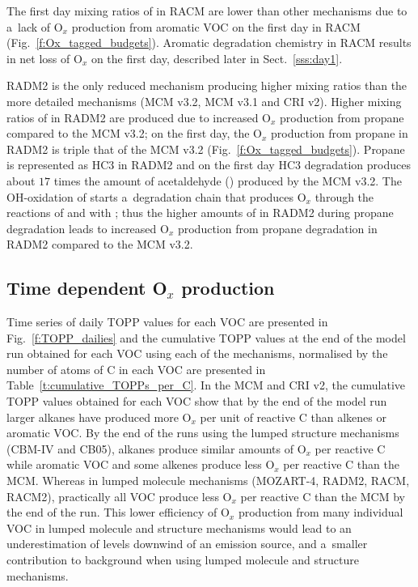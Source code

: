 \documentclass[acpd, online, hvmath]{copernicus}
\begin{document}
The first day mixing ratios of  in RACM are lower than other
mechanisms due to a~lack of O$_{x}$ production from aromatic VOC on
the first day in RACM (Fig.~\ref{f:Ox_tagged_budgets}).  Aromatic
degradation chemistry in RACM results in net loss of O$_{x}$ on the
first day, described later in Sect.~\ref{sss:day1}.

RADM2 is the only reduced mechanism producing higher  mixing
ratios than the more detailed mechanisms (MCM v3.2, MCM v3.1 and CRI
v2).  Higher mixing ratios of  in RADM2 are produced due to
increased O$_{x}$ production from propane compared to the MCM v3.2;
on the first day, the O$_{x}$ production from propane in RADM2 is
triple that of the MCM v3.2 (Fig.~\ref{f:Ox_tagged_budgets}).  Propane
is represented as HC3 in RADM2 \citep{Stockwell:1990} and on the first
day HC3 degradation produces about $17$ times the amount of
acetaldehyde () produced by the MCM v3.2.  The
OH-oxidation of  starts a~degradation chain that
produces O$_{x}$ through the reactions of  and
 with ; thus the higher amounts of
 in RADM2 during propane degradation leads to increased
O$_{x}$ production from propane degradation in RADM2 compared to
the MCM v3.2.


\subsection{Time dependent O$_{x}$ production}

Time series of daily TOPP values for each VOC are presented in
Fig.~\ref{f:TOPP_dailies} and the cumulative TOPP values at the end of
the model run obtained for each VOC using each of the mechanisms,
normalised by the number of atoms of C in each VOC are presented in
Table~\ref{t:cumulative_TOPPs_per_C}.  In the MCM and CRI v2, the
cumulative TOPP values obtained for each VOC show that by the end of
the model run larger alkanes have produced more O$_{x}$ per unit of
reactive C than alkenes or aromatic VOC.  By the end of the runs using
the lumped structure mechanisms (CBM-IV and CB05), alkanes produce
similar amounts of O$_{x}$ per reactive C while aromatic VOC and
some alkenes produce less O$_{x}$ per reactive C than the MCM.
Whereas in lumped molecule mechanisms (MOZART-4, RADM2, RACM, RACM2),
practically all VOC produce less O$_{x}$ per reactive C than the
MCM by the end of the run.  This lower efficiency of O$_{x}$
production from many individual VOC in lumped molecule and structure
mechanisms would lead to an underestimation of  levels
downwind of an emission source, and a~smaller contribution to
background  when using lumped molecule and structure
mechanisms.
\end{document}
